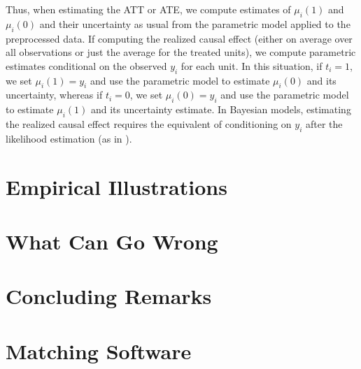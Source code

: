 \documentclass[11pt,titlepage]{article}
\begin{document}
Thus, when estimating the ATT or ATE, we compute estimates of
$\mu_i(1)$ and $\mu_i(0)$ and their uncertainty as usual from the
parametric model applied to the preprocessed data.  If computing the
realized causal effect (either on average over all observations or
just the average for the treated units), we compute parametric
estimates conditional on the observed $y_i$ for each unit.  In this
situation, if $t_i=1$, we set $\mu_i(1)=y_i$ and use the parametric
model to estimate $\mu_i(0)$ and its uncertainty, whereas if $t_i=0$,
we set $\mu_i(0)=y_i$ and use the parametric model to estimate
$\mu_i(1)$ and its uncertainty estimate.  In Bayesian models,
estimating the realized causal effect requires the equivalent of
conditioning on $y_i$ after the likelihood estimation (as in
\citet{King97}).

\section{Empirical Illustrations}

\section{What Can Go Wrong}

\section{Concluding Remarks}

\appendix
\section{Matching Software}

\baselineskip
 

\end{document}
